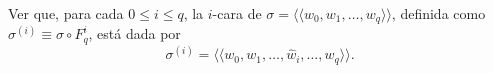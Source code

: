 \begin{ejercicio}
Ver que, para cada $0 \leq i \leq q$, la $i$-cara de $\sigma = \langle\!\langle w_0, w_1, \dots, w_q \rangle\!\rangle$, definida como $\sigma^{(i)} \equiv \sigma \circ F_q^i$, está dada por
\[
\sigma^{(i)} = \langle\!\langle w_0, w_1, \dots, \hat{w}_i, \dots, w_q \rangle\!\rangle.
\]
\end{ejercicio}

\begin{demostracion}

\end{demostracion}
